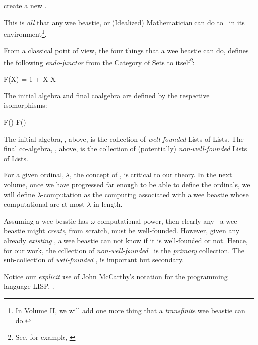 \item create a new  \lol.

\stopitemize

\noindent This is \emph{all} that any wee beastie, or (Idealized) 
Mathematician can do to \lols\ in its environment\footnote{In Volume II, 
we will add one more thing that a \emph{transfinite} wee beastie can do.}. 

\stopDefinition

\startMMundi From a classical point of view, the four things that a 
wee beastie can do, defines the following \emph{endo-functor} from the 
Category of Sets to itself\footnote{See, for example, 
\cite{jacobs2017coalgebras}}: 

\placeformula[+]\startformula
  F(X) = 1 + X \times X
\stopformula

\noindent The initial algebra and final coalgebra are defined by the 
respective isomorphisms: 

\placesubformula\startformula\startalign
  \NC F(\wflol) \NC \longRightIsoArrow \wflol  \NR[eq:a][a]
  \NC \lol      \NC \longRightIsoArrow F(\lol) \NR[eq:b][b]
\stopalign\stopformula

\noindent The initial algebra, \wflol, above, is the collection of 
\emph{well-founded} Lists of Lists. The final co-algebra, \lol, above, is 
the collection of (potentially) \emph{non-well-founded} Lists of Lists. 

For a given ordinal, $\lambda$, the concept of 
, is critical to our theory. In the 
next volume, once we have progressed far enough to be able to define the 
ordinals, we will define $\lambda$-computation as the computing 
 associated with a wee beastie whose computational 
 are at most $\lambda$ in length. 

Assuming a wee beastie has $\omega$-computational power, then clearly any 
\lol\ a wee beastie might \emph{create}, from scratch, must be 
well-founded. However, given any already \emph{existing} \lol, a wee 
beastie can not know if it is well-founded or not. Hence, for our work, 
the collection of \emph{non-well-founded} \lols\ is the \emph{primary} 
collection. The sub-collection of \emph{well-founded} \lols, is important 
but secondary. 

Notice our \emph{explicit} use of John McCarthy's notation for the 
programming language LISP, 
\cite{mcCarthyAbrahamsEdwardsHartLevin1965lispManual}. \stopMMundi 

\startMMundi

